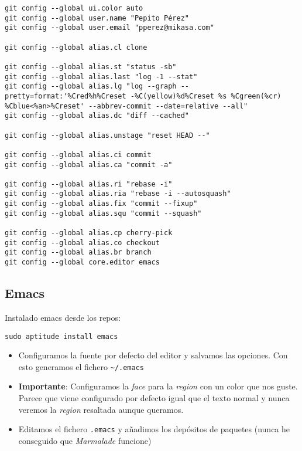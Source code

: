\documentclass[
  12pt,
  spanish,
]{article}
\providecommand{\tightlist}{%
  \setlength{\itemsep}{0pt}\setlength{\parskip}{0pt}}
\begin{document}
\begin{verbatim}
git config --global ui.color auto
git config --global user.name "Pepito Pérez"
git config --global user.email "pperez@mikasa.com"

git config --global alias.cl clone

git config --global alias.st "status -sb"
git config --global alias.last "log -1 --stat"
git config --global alias.lg "log --graph --pretty=format:'%Cred%h%Creset -%C(yellow)%d%Creset %s %Cgreen(%cr) %Cblue<%an>%Creset' --abbrev-commit --date=relative --all"
git config --global alias.dc "diff --cached"

git config --global alias.unstage "reset HEAD --"

git config --global alias.ci commit
git config --global alias.ca "commit -a"

git config --global alias.ri "rebase -i"
git config --global alias.ria "rebase -i --autosquash"
git config --global alias.fix "commit --fixup"
git config --global alias.squ "commit --squash"

git config --global alias.cp cherry-pick
git config --global alias.co checkout
git config --global alias.br branch
git config --global core.editor emacs
\end{verbatim}

\hypertarget{emacs}{%
\subsection{Emacs}\label{emacs}}

Instalado emacs desde los repos:

\begin{verbatim}
sudo aptitude install emacs
\end{verbatim}

\begin{itemize}
\tightlist
\item
  Configuramos la fuente por defecto del editor y salvamos las opciones.
  Con esto generamos el fichero \texttt{\textasciitilde{}/.emacs}
\item
  \textbf{Importante}: Configuramos la \emph{face} para la \emph{region}
  con un color que nos guste. Parece que viene configurado por defecto
  igual que el texto normal y nunca veremos la \emph{region} resaltada
  aunque queramos.
\item
  Editamos el fichero \texttt{.emacs} y añadimos los depósitos de
  paquetes (nunca he conseguido que \emph{Marmalade} funcione)
\end{itemize}
\end{document}
